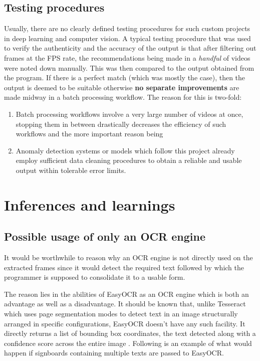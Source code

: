 \subsection{Testing procedures}

Usually, there are no clearly defined testing procedures for such custom projects in deep learning and computer vision. A typical testing procedure that was used to verify the authenticity and the accuracy of the output is that after filtering out frames at the FPS rate, the recommendations being made in a \textit{handful} of videos were noted down manually. This was then compared to the output obtained from the program. If there is a perfect match (which was mostly the case), then the output is deemed to be suitable otherwise \textbf{no separate improvements} are made midway in a batch processing workflow. The reason for this is two-fold:

\begin{enumerate}

 \item Batch processing workflows involve a very large number of videos at once, stopping them in between drastically decreases the efficiency of such workflows and the more important reason being

 \item Anomaly detection systems or models which follow this project already employ sufficient data cleaning procedures to obtain a reliable and usable output within tolerable error limits.

\end{enumerate}

\section{Inferences and learnings}

\subsection{Possible usage of only an OCR engine}

It would be worthwhile to reason why an OCR engine is not directly used on the extracted frames since it would detect the required text followed by which the programmer is supposed to consolidate it to a usable form. \par

The reason lies in the abilities of EasyOCR as an OCR engine which is both an advantage as well as a disadvantage. It should be known that, unlike Tesseract which uses page segmentation modes \cite{Rosebroc2021} to detect text in an image structurally arranged in specific configurations, EasyOCR doesn’t have any such facility. It directly returns a list of bounding box coordinates, the text detected along with a confidence score across the entire image \cite{Jaided}. Following is an example of what would happen if signboards containing multiple texts are passed to EasyOCR.

